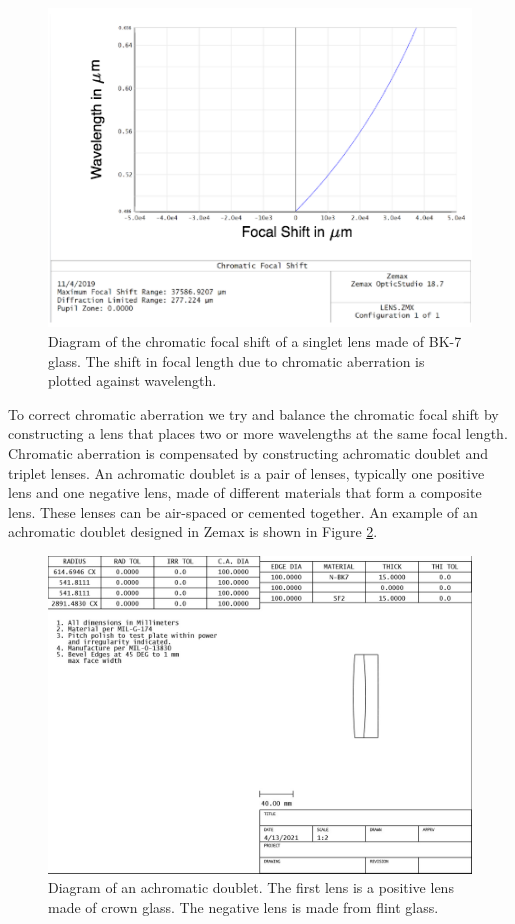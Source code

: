 \begin{figure}
    \centering
    \includegraphics[width=.7\textwidth]{Chapter Materials/Chapter Three Materials/focalshift.png}
    \caption{Diagram of the chromatic focal shift of a singlet lens made of BK-7 glass. The shift in focal length due to chromatic aberration is plotted against wavelength.}
    \label{fig:focalshift}
\end{figure}

To correct chromatic aberration we try and balance the chromatic focal shift by constructing a lens that places two or more wavelengths at the same focal length. Chromatic aberration is compensated by constructing achromatic doublet and triplet lenses. An achromatic doublet is a pair of lenses, typically one positive lens and one negative lens, made of different materials that form a composite lens. These lenses can be air-spaced or cemented together. An example of an achromatic doublet designed in Zemax is shown in Figure \ref{fig:crownflint}.

\begin{figure}
    \centering
    \includegraphics[width=.8\textwidth]{Chapter Materials/Chapter Three Materials/doublet.jpg}
    \caption{Diagram of an achromatic doublet. The first lens is a positive lens made of crown glass. The negative lens is made from flint glass. }
    \label{fig:crownflint}
\end{figure}

